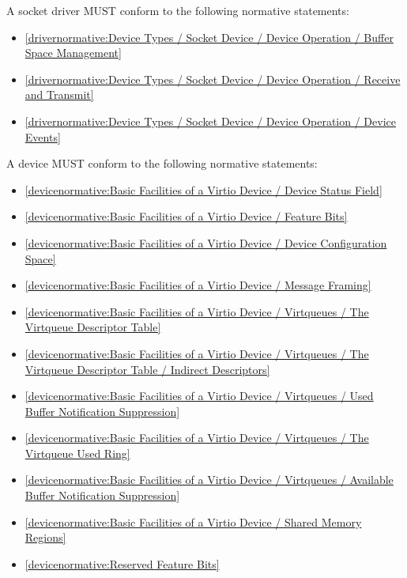\label{sec:Conformance / Driver Conformance / Socket Driver Conformance}

A socket driver MUST conform to the following normative statements:

\begin{itemize}
\item \ref{drivernormative:Device Types / Socket Device / Device Operation / Buffer Space Management}
\item \ref{drivernormative:Device Types / Socket Device / Device Operation / Receive and Transmit}
\item \ref{drivernormative:Device Types / Socket Device / Device Operation / Device Events}
\end{itemize}

\label{sec:Conformance / Device Conformance}

A device MUST conform to the following normative statements:

\begin{itemize}
\item \ref{devicenormative:Basic Facilities of a Virtio Device / Device Status Field}
\item \ref{devicenormative:Basic Facilities of a Virtio Device / Feature Bits}
\item \ref{devicenormative:Basic Facilities of a Virtio Device / Device Configuration Space}
\item \ref{devicenormative:Basic Facilities of a Virtio Device / Message Framing}
\item \ref{devicenormative:Basic Facilities of a Virtio Device / Virtqueues / The Virtqueue Descriptor Table}
\item \ref{devicenormative:Basic Facilities of a Virtio Device / Virtqueues / The Virtqueue Descriptor Table / Indirect Descriptors}
\item \ref{devicenormative:Basic Facilities of a Virtio Device / Virtqueues / Used Buffer Notification Suppression}
\item \ref{devicenormative:Basic Facilities of a Virtio Device / Virtqueues / The Virtqueue Used Ring}
\item \ref{devicenormative:Basic Facilities of a Virtio Device / Virtqueues / Available Buffer Notification Suppression}
\item \ref{devicenormative:Basic Facilities of a Virtio Device / Shared Memory Regions}
\item \ref{devicenormative:Reserved Feature Bits}
\end{itemize}

